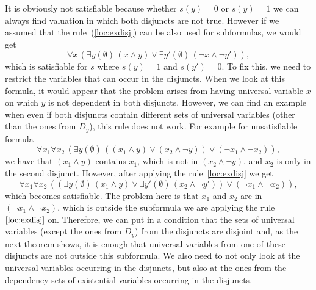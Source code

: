 \documentclass[
  digital, %
  color,
  twoside, %
  table,   %
  nolof,     %
  nolot,     %
]{fithesis3}
\theoremstyle{definition}
\theoremstyle{remark}
\newcommand{\itholds}{\,}
\begin{document}
It is obviously not satisfiable because whether $s(y) = 0$ or $s(y) = 1$ we can always find valuation in which both disjuncts are not true. However if we assumed that the rule~(\ref{loc:exdisj}) can be also used for subformulas, we would get
\[\forall x \itholds (\exists y(\emptyset) \itholds (x \land y) \lor \exists y'(\emptyset) \itholds (\neg x \land \neg y')),\]
which is satisfiable for $s$ where $s(y) = 1$ and $s(y') = 0$. To fix this, we need to restrict the variables that can occur in the disjuncts. When we look at this formula, it would appear that the problem arises from having universal variable $x$ on which $y$ is not dependent in both disjuncts. However, we can find an example when even if both disjuncts contain different sets of universal variables (other than the ones from $D_y$), this rule does not work. For example for unsatisfiable formula
\[\forall x_1 \forall x_2 \itholds (\exists y(\emptyset) \itholds ((x_1 \land y) \lor (x_2 \land \neg y)) \lor (\neg x_1 \land \neg x_2)),\]
we have that $(x_1 \land y)$ contains $x_1$, which is not in $(x_2 \land \neg y)$. and $x_2$ is only in the second disjunct. However, after applying the rule~\eqref{loc:exdisj} we get
\[\forall x_1 \forall x_2 \itholds ((\exists y(\emptyset) \itholds (x_1 \land y) \lor \exists y'(\emptyset) \itholds (x_2 \land \neg y')) \lor (\neg x_1 \land \neg x_2)),\]
which becomes satisfiable. The problem here is that $x_1$ and $x_2$ are in $(\neg x_1 \land \neg x_2)$, which is outside the subformula we are applying the rule $\eqref{loc:exdisj}$ on. Therefore, we can put in a condition that the sets of universal variables (except the ones from $D_y$) from the disjuncts are disjoint and, as the next theorem shows, it is enough that universal variables from one of these disjuncts are not outside this subformula. We also need to not only look at the universal variables occurring in the disjuncts, but also at the ones from the dependency sets of existential variables occurring in the disjuncts.
\end{document}
